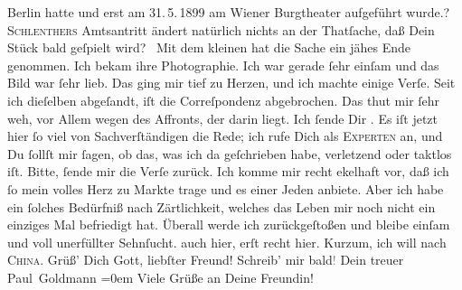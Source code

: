 \begin{ledgroupsized}[t]{13cm}
{{{                     Berlin hatte und erst am 31. 5. 1899 am Wiener Burgtheater aufgeführt wurde.}}}\label{K_L02836-3h}? \textsc{Schlenthers}{ }Amtsantritt ändert natürlich
               nichts an der Thatſache, daß Dein Stück bald geſpielt wird? {\dotsfive}\pend
           \pstart
           {\pb}Mit dem kleinen \label{K_L02836-4v}\label{K_L02836-4h} hat die Sache ein jähes Ende genommen. Ich bekam ihre Photographie. Ich war
               gerade ſehr einſam und das Bild war ſehr lieb. Das ging mir tief zu Herzen, und ich
               machte einige Verſe. Seit ich dieſelben abgeſandt, iſt die Correſpondenz abgebrochen.
               Das thut mir ſehr weh, \strikeout{\textcolor{gray}{v}} vor Allem wegen des Affronts, der darin liegt. Ich ſende Dir \label{K_L02836-5v}\label{K_L02836-5h}. Es iſt jetzt hier ſo viel von
               Sachverſtändigen die Rede; ich rufe Dich als \textsc{Experten} an,
               und Du ſollſt mir ſagen, ob das, was ich da geſchrieben habe, verletzend oder taktlos
               iſt. Bitte, ſende mir die Verſe zurück. Ich komme mir recht ekelhaft vor, daß ich ſo
               mein volles Herz zu Markte trage und es einer Jeden anbiete. Aber ich habe ein
               ſolches {\pb}Bedürfniß nach Zärtlichkeit, welches das
               Leben mir noch nicht ein einziges Mal befriedigt hat. Überall werde ich
               zurückgeſtoßen und bleibe einſam und voll unerfüllter Sehnſucht. \label{K_L02836-6v}\label{K_L02836-6h} auch hier,
               erſt recht hier. Kurzum, ich will nach \textsc{China}.\pend
           \pstart
           Grüß’ Dich Gott, liebſter Freund! Schreib’ mir bald\textcolor{gray}{!}\pend
           \pstart
           Dein treuer {\\[\baselineskip]}\spacefill\mbox{Paul Goldmann}\pend
           \leftskip=0em{}\pstart
           \noindent{}Viele Grüße an Deine Freundin!\pend
           

\end{ledgroupsized}
